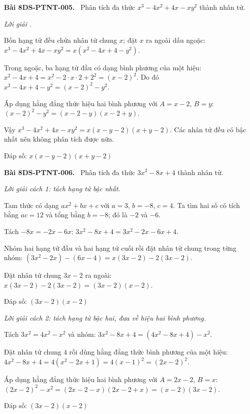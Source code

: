 \documentclass[12pt,a4paper]{article}
\newenvironment{problem}[1][]{\par\medskip\noindent\textbf{Bài #1.}\ }{\par}
\newenvironment{solution}[1][]{\par\noindent\textit{Lời giải #1.}\par}{\par}
\begin{document}
\begin{problem}[8DS-PTNT-005]
Phân tích đa thức $x^3 - 4x^2 + 4x - xy^2$ thành nhân tử.

\begin{solution}
Bốn hạng tử đều chứa nhân tử chung $x$; đặt $x$ ra ngoài dấu ngoặc: $x^3 - 4x^2 + 4x - xy^2 = x(x^2 - 4x + 4 - y^2)$.

Trong ngoặc, ba hạng tử đầu có dạng bình phương của một hiệu: $x^2 - 4x + 4 = x^2 - 2 \cdot x \cdot 2 + 2^2 = (x - 2)^2$. Do đó $x^2 - 4x + 4 - y^2 = (x - 2)^2 - y^2$.

Áp dụng hằng đẳng thức hiệu hai bình phương với $A = x - 2$, $B = y$: $(x - 2)^2 - y^2 = (x - 2 - y)(x - 2 + y)$.

Vậy $x^3 - 4x^2 + 4x - xy^2 = x(x - y - 2)(x + y - 2)$. Các nhân tử đều có bậc nhất nên không phân tích được nữa.

Đáp số: $\boxed{x(x - y - 2)(x + y - 2)}$
\end{solution}
\end{problem}

\begin{problem}[8DS-PTNT-006]
Phân tích đa thức $3x^2 - 8x + 4$ thành nhân tử.

\begin{solution}[cách 1: tách hạng tử bậc nhất]
Tam thức có dạng $ax^2 + bx + c$ với $a = 3$, $b = -8$, $c = 4$. Ta tìm hai số có tích bằng $ac = 12$ và tổng bằng $b = -8$; đó là $-2$ và $-6$.

Tách $-8x = -2x - 6x$: $3x^2 - 8x + 4 = 3x^2 - 2x - 6x + 4$.

Nhóm hai hạng tử đầu và hai hạng tử cuối rồi đặt nhân tử chung trong từng nhóm: $(3x^2 - 2x) - (6x - 4) = x(3x - 2) - 2(3x - 2)$.

Đặt nhân tử chung $3x - 2$ ra ngoài: $x(3x - 2) - 2(3x - 2) = (3x - 2)(x - 2)$.

Đáp số: $\boxed{(3x - 2)(x - 2)}$
\end{solution}

\begin{solution}[cách 2: tách hạng tử bậc hai, đưa về hiệu hai bình phương]
Tách $3x^2 = 4x^2 - x^2$ và nhóm: $3x^2 - 8x + 4 = (4x^2 - 8x + 4) - x^2$.

Đặt nhân tử chung $4$ rồi dùng hằng đẳng thức bình phương của một hiệu: $4x^2 - 8x + 4 = 4(x^2 - 2x + 1) = 4(x - 1)^2 = (2x - 2)^2$.

Áp dụng hằng đẳng thức hiệu hai bình phương với $A = 2x - 2$, $B = x$: $(2x - 2)^2 - x^2 = (2x - 2 - x)(2x - 2 + x) = (x - 2)(3x - 2)$.

Đáp số: $\boxed{(3x - 2)(x - 2)}$
\end{solution}
\end{problem}
\end{document}
